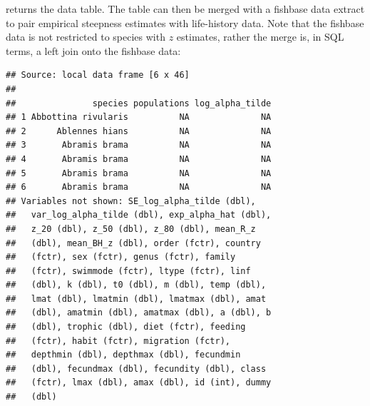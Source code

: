 \documentclass{dragonfly-report}
\begin{document}
returns the data table. The table can then be merged with a fishbase data extract to pair empirical steepness estimates with life-history data. Note that the fishbase data is not restricted to species with $z$ estimates, rather the merge is, in SQL terms, a left join onto the fishbase data:

\begin{knitrout}
\color{fgcolor}\begin{kframe}
\begin{alltt}
 \hlkwb{<-} \hlopt{$}\hlstd{(}\hlstd{)}
 \hlkwb{<-} \hlopt{!} \hlopt{& !}
\hlopt{$} \hlkwb{<-} \hlopt{:}
\hlopt{$} \hlkwb{<-} 

 \hlkwb{<-} \hlopt{$}

\hlstd{(}
\end{alltt}
\begin{verbatim}
## Source: local data frame [6 x 46]
## 
##               species populations log_alpha_tilde
## 1 Abbottina rivularis          NA              NA
## 2      Ablennes hians          NA              NA
## 3       Abramis brama          NA              NA
## 4       Abramis brama          NA              NA
## 5       Abramis brama          NA              NA
## 6       Abramis brama          NA              NA
## Variables not shown: SE_log_alpha_tilde (dbl),
##   var_log_alpha_tilde (dbl), exp_alpha_hat (dbl),
##   z_20 (dbl), z_50 (dbl), z_80 (dbl), mean_R_z
##   (dbl), mean_BH_z (dbl), order (fctr), country
##   (fctr), sex (fctr), genus (fctr), family
##   (fctr), swimmode (fctr), ltype (fctr), linf
##   (dbl), k (dbl), t0 (dbl), m (dbl), temp (dbl),
##   lmat (dbl), lmatmin (dbl), lmatmax (dbl), amat
##   (dbl), amatmin (dbl), amatmax (dbl), a (dbl), b
##   (dbl), trophic (dbl), diet (fctr), feeding
##   (fctr), habit (fctr), migration (fctr),
##   depthmin (dbl), depthmax (dbl), fecundmin
##   (dbl), fecundmax (dbl), fecundity (dbl), class
##   (fctr), lmax (dbl), amax (dbl), id (int), dummy
##   (dbl)
\end{verbatim}
\end{kframe}
\end{knitrout}
\end{document}
